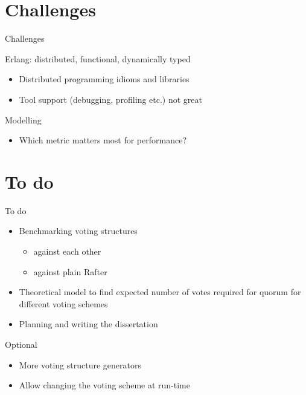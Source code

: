 \documentclass{beamer}
\begin{document}
\section{Challenges}
\begin{frame}{Challenges}
    \begin{block}{Erlang: distributed, functional, dynamically typed}
        \begin{itemize}
            \item Distributed programming idioms and libraries
            \item Tool support (debugging, profiling etc.) not great
        \end{itemize}
    \end{block}
    \begin{block}{Modelling}
        \begin{itemize}
            \item Which metric matters most for performance?
        \end{itemize}
    \end{block}
\end{frame}

\section{To do}
\begin{frame}{To do}
    \begin{itemize}
        \item Benchmarking voting structures
            \begin{itemize}
                \item against each other
                \item against plain Rafter
            \end{itemize}
        \item Theoretical model to find expected number of votes required for quorum for different voting schemes
        \item Planning and writing the dissertation
    \end{itemize}
    \begin{block}{Optional}
        \begin{itemize}
            \item More voting structure generators
            \item Allow changing the voting scheme at run-time %
        \end{itemize}
    \end{block}
\end{frame}
\end{document}
